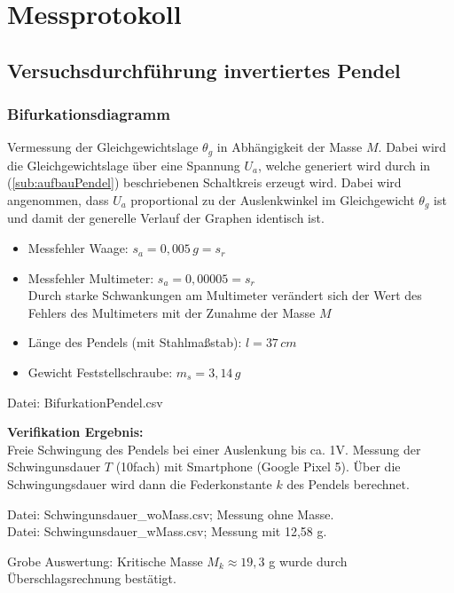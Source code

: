

\chapter{Messprotokoll}
\label{chap:protokoll}


\section{Versuchsdurchführung invertiertes Pendel}
\label{sec:versuchPendel}
\subsection{Bifurkationsdiagramm}
\label{sub:bifu}
Vermessung der Gleichgewichtslage $\theta_g$ in Abhängigkeit der Masse $M$. Dabei wird die Gleichgewichtslage über eine Spannung $U_a$, welche generiert wird durch in (\ref{sub:aufbauPendel}) beschriebenen Schaltkreis erzeugt wird. Dabei wird angenommen, dass $U_a$ proportional zu der Auslenkwinkel im Gleichgewicht $\theta_g$ ist und damit der generelle Verlauf der Graphen identisch ist.
\begin{itemize}
\item Messfehler Waage: $s_a = 0,005\, g = s_r$
\item Messfehler Multimeter: $s_a = 0,00005 = s_r$\\
      Durch starke Schwankungen am Multimeter verändert sich der Wert des Fehlers des Multimeters mit der Zunahme der Masse $M$
\item Länge des Pendels (mit Stahlmaßstab): $l = 37 \, cm$
\item Gewicht Feststellschraube: $m_s = 3,14 \,g$
\end{itemize}
Datei: BifurkationPendel.csv

\textbf{Verifikation Ergebnis:}\\
Freie Schwingung des Pendels bei einer Auslenkung bis ca. 1V. Messung der Schwingunsdauer $T$ (10fach) mit Smartphone (Google Pixel 5). Über die Schwingungsdauer wird dann die Federkonstante $k$ des Pendels berechnet.

Datei: Schwingunsdauer\_woMass.csv; Messung ohne Masse.\\
Datei: Schwingunsdauer\_wMass.csv; Messung mit 12,58 g.

Grobe Auswertung: Kritische Masse $M_k\approx19,3$ g wurde durch Überschlagsrechnung bestätigt.

